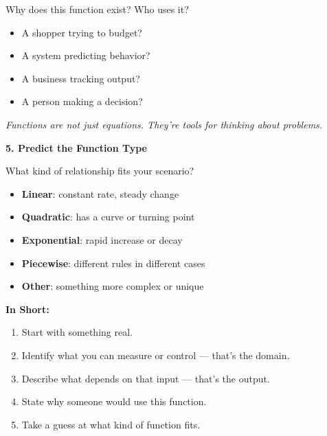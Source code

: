 \documentclass[12pt]{article}
\begin{document}
Why does this function exist? Who uses it?

\begin{itemize}[nosep]
  \item A shopper trying to budget?
  \item A system predicting behavior?
  \item A business tracking output?
  \item A person making a decision?
\end{itemize}

\textit{Functions are not just equations. They're tools for thinking about problems.}

\textbf{5. Predict the Function Type}

What kind of relationship fits your scenario?

\begin{itemize}[nosep]
  \item \textbf{Linear}: constant rate, steady change
  \item \textbf{Quadratic}: has a curve or turning point
  \item \textbf{Exponential}: rapid increase or decay
  \item \textbf{Piecewise}: different rules in different cases
  \item \textbf{Other}: something more complex or unique
\end{itemize}

\textbf{In Short:}
\begin{enumerate}[nosep]
  \item Start with something real.
  \item Identify what you can measure or control — that's the domain.
  \item Describe what depends on that input — that's the output.
  \item State why someone would use this function.
  \item Take a guess at what kind of function fits.
\end{enumerate}
\end{document}
